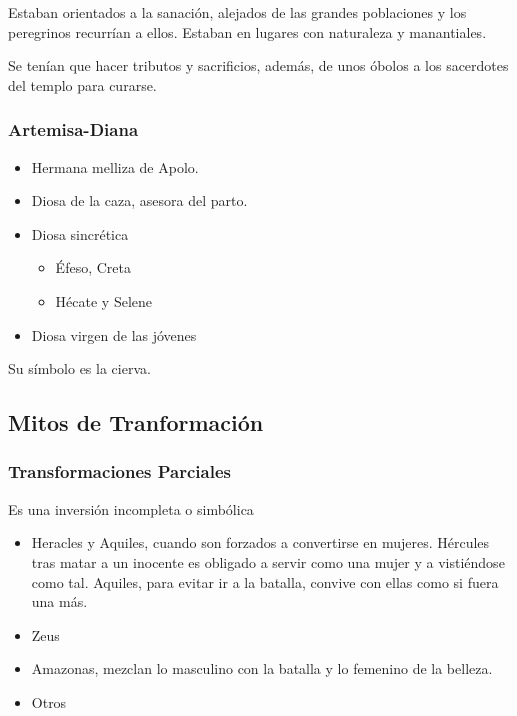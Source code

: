 Estaban orientados a la sanación, alejados de las grandes poblaciones y los peregrinos recurrían a ellos. Estaban en lugares con naturaleza y manantiales.

Se tenían que hacer tributos y sacrificios, además, de unos óbolos a los sacerdotes del templo para curarse.

\subsubsection{Artemisa-Diana}
\begin{itemize}
	\item Hermana melliza de Apolo.
	\item Diosa de la caza, asesora del parto.
	\item Diosa sincrética
	      \begin{itemize}
		      \item Éfeso, Creta
		      \item Hécate y Selene
	      \end{itemize}
	\item Diosa virgen de las jóvenes
\end{itemize}

Su símbolo es la cierva.

\subsection{Mitos de Tranformación}

\subsubsection{Transformaciones Parciales}
Es una inversión incompleta o simbólica
\begin{itemize}
	\item Heracles y Aquiles, cuando son forzados a convertirse en mujeres. Hércules tras matar a un inocente es obligado a servir como una mujer y a vistiéndose como tal. Aquiles, para evitar ir a la batalla, convive con ellas como si fuera una más.
	\item Zeus
	\item Amazonas, mezclan lo masculino con la batalla y lo femenino de la belleza.
	\item Otros
\end{itemize}

